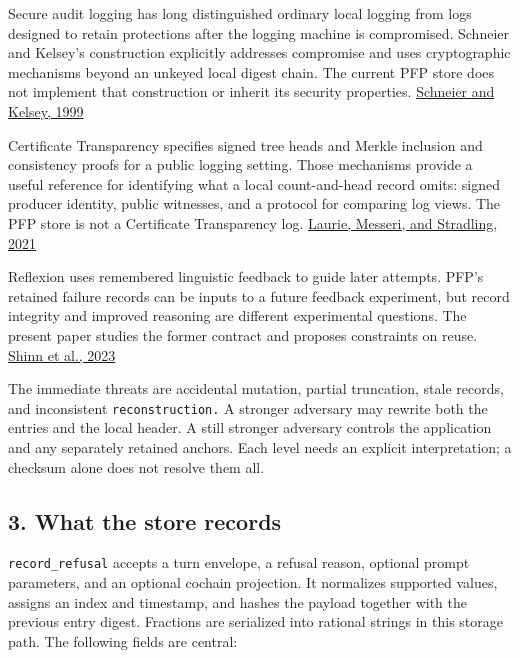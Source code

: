 \documentclass[
  11pt,
]{article}
\begin{document}
Secure audit logging has long distinguished ordinary local logging from
logs designed to retain protections after the logging machine is
compromised. Schneier and Kelsey's construction explicitly addresses
compromise and uses cryptographic mechanisms beyond an unkeyed local
digest chain. The current PFP store does not implement that construction
or inherit its security properties.
\href{https://www.schneier.com/academic/archives/1999/05/secure_audit_logs_to.html}{Schneier
and Kelsey, 1999}

Certificate Transparency specifies signed tree heads and Merkle
inclusion and consistency proofs for a public logging setting. Those
mechanisms provide a useful reference for identifying what a local
count-and-head record omits: signed producer identity, public witnesses,
and a protocol for comparing log views. The PFP store is not a
Certificate Transparency log.
\href{https://www.rfc-editor.org/rfc/rfc9162.html}{Laurie, Messeri, and
Stradling, 2021}

Reflexion uses remembered linguistic feedback to guide later attempts.
PFP's retained failure records can be inputs to a future feedback
experiment, but record integrity and improved reasoning are different
experimental questions. The present paper studies the former contract
and proposes constraints on reuse.
\href{https://arxiv.org/abs/2303.11366v4}{Shinn et al., 2023}

The immediate threats are accidental mutation, partial truncation, stale
records, and inconsistent \nolinkurl{reconstruction.} A stronger
adversary may rewrite both the entries and the local header. A still
stronger adversary controls the application and any separately retained
anchors. Each level needs an explicit interpretation; a checksum alone
does not resolve them all.

\subsection{3. What the store records}\label{what-the-store-records}

\nolinkurl{record_refusal} accepts a turn envelope, a refusal reason,
optional prompt parameters, and an optional cochain projection. It
normalizes supported values, assigns an index and timestamp, and hashes
the payload together with the previous entry digest. Fractions are
serialized into rational strings in this storage path. The following
fields are central:
\end{document}
